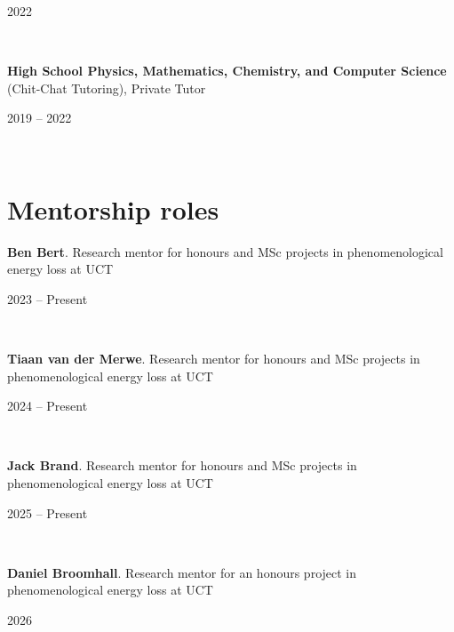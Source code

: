 \documentclass[11pt,letter,sans]{moderncv}
\begin{document}
\begin{minipage}[t]{0.2\textwidth}
  \hfill 2022 
\end{minipage}\\
\begin{minipage}[t]{0.8\textwidth}
	\textbf{High School Physics, Mathematics, Chemistry, and Computer Science} (Chit-Chat Tutoring), Private Tutor
\end{minipage}\hfill
\begin{minipage}[t]{0.2\textwidth}
  \hfill 2019 -- 2022 
\end{minipage}\\


\section{Mentorship roles}
\begin{minipage}[t]{0.8\textwidth}
	\textbf{Ben Bert}. Research mentor for honours and MSc projects in phenomenological energy loss at UCT
\end{minipage}\hfill
\begin{minipage}[t]{0.2\textwidth}
  \hfill 2023 -- Present 
\end{minipage}\\[2mm]
\begin{minipage}[t]{0.8\textwidth}
	\textbf{Tiaan van der Merwe}. Research mentor for honours and MSc projects in phenomenological energy loss at UCT
\end{minipage}\hfill
\begin{minipage}[t]{0.2\textwidth}
  \hfill 2024 -- Present 
\end{minipage}\\[2mm]
\begin{minipage}[t]{0.8\textwidth}
	\textbf{Jack Brand}. Research mentor for honours and MSc projects in phenomenological energy loss at UCT
\end{minipage}\hfill
\begin{minipage}[t]{0.2\textwidth}
  \hfill 2025 -- Present 
\end{minipage}\\[2mm]
\begin{minipage}[t]{0.8\textwidth}
	\textbf{Daniel Broomhall}. Research mentor for an honours project in phenomenological energy loss at UCT
\end{minipage}\hfill
\begin{minipage}[t]{0.2\textwidth}
  \hfill 2026 
\end{minipage}\\[2mm]
\end{document}
